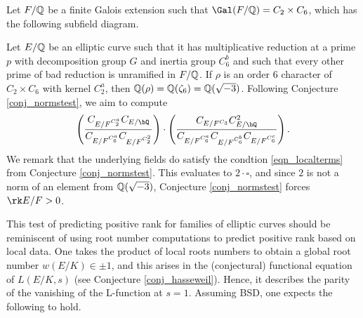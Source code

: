 \begin{example}
    Let $F/\mathbb{Q}$ be a finite Galois extension such that $\Gal(F/\QQ)=C_2\times C_6$, which has the following subfield diagram.
    \begin{figure}[H]
        \centering
    \end{figure}
    Let $E/\mathbb{Q}$ be an elliptic curve such that it has multiplicative reduction at a prime $p$ with decomposition group $G$ and inertia group $C_6^b$ and such that every other prime of bad reduction is unramified in $F/\mathbb{Q}$. If $\rho$ is an order $6$ character of $C_2\times C_6$ with kernel $C_2^a$, then $\mathbb{Q}(\rho)=\mathbb{Q}(\zeta_6)=\mathbb{Q}(\sqrt{-3})$. Following Conjecture \ref{conj_normstest}, we aim to compute 
    \begin{equation*}\label{eqn-rel2}
        \left(\frac{C_{E / F^{C_2^a}} C_{E / \bQ} }{C_{E / F^{C_6^a}} C_{E / F^{C_2^2}}}\right) \cdot \left( \frac{C_{E / F^{C_3}} C_{E / \bQ}^2}{C_{E / F^{C_6^a}}C_{E / F^{C_6^b}}  C_{E / F^{C_6^c}} } \right).
    \end{equation*}
    We remark that the underlying fields do satisfy the condtion \eqref{eqn_localterms} from Conjecture \ref{conj_normstest}. This evaluates to $2\cdot\square$, and since $2$ is not a norm of an element from $\mathbb{Q}(\sqrt{-3})$, Conjecture \ref{conj_normstest} forces $\rk E/F>0$. 
\end{example}

This test of predicting positive rank for families of elliptic curves should be reminiscent of using root number computations to predict positive rank based on local data. One takes the product of local roots numbers to obtain a global root number $w(E/K)\in{\pm1}$, and this arises in the (conjectural) functional equation of $L(E/K,s)$ (see Conjecture \ref{conj_hasseweil}). Hence, it describes the parity of the vanishing of the L-function at $s=1$. Assuming BSD, one expects the following to hold.

